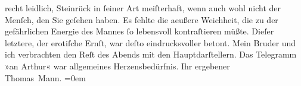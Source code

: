 \begin{ledgroupsized}[t]{13cm}
               recht leidlich, Steinrück in ſeiner Art
                  meiſter{\pb}haft, wenn auch wohl nicht der
               Menſch, den Sie geſehen haben. Es fehlte die aeußere Weichheit, die zu der
               gefährlichen Energie des Mannes ſo lebensvoll kontraſtieren müßte. Dieſer letztere,
               der erotiſche Ernſt, war deſto eindrucksvoller betont. Mein Bruder und ich verbrachten den Reſt des
               Abends \introOben{}mit\introOben{} den Hauptdarſtellern. Das Telegramm »an Arthur«
               war allgemeines Herzensbedürfnis.\pend
           \pstart
           Ihr ergebener{\\[\baselineskip]}\spacefill\mbox{Thomas Mann.}\pend
           \leftskip=0em{}
         
         \endnumbering{}\end{ledgroupsized}  \newcommand{\dateiname}{L02039}\newcommand{\titel}{Thomas Mann an Arthur Schnitzler, 16. 10. 1911}\newcommand{\editorInnen}{Martin Anton Müller und Gerd-Hermann Susen}
      